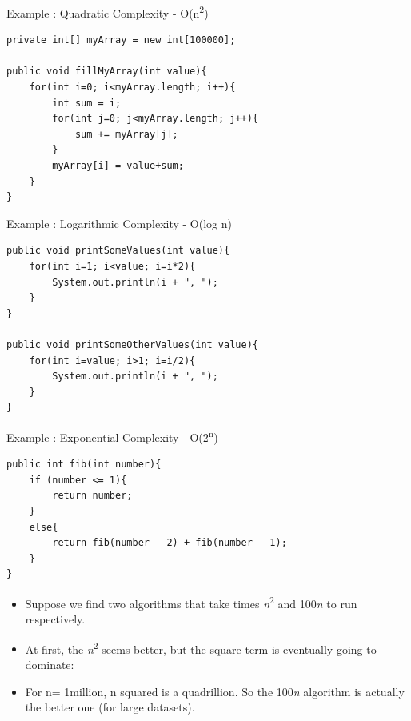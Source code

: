\documentclass{beamer}
\begin{document}
\begin{frame}[fragile]
Example : Quadratic Complexity - O(n\textsuperscript{2})
\begin{block}{}
\begin{lstlisting}
private int[] myArray = new int[100000];

public void fillMyArray(int value){
    for(int i=0; i<myArray.length; i++){
        int sum = i;
        for(int j=0; j<myArray.length; j++){
            sum += myArray[j];
        }
        myArray[i] = value+sum;
    }
}
\end{lstlisting}
\end{block}
\end{frame}

\begin{frame}[fragile]
Example : Logarithmic Complexity - O(log n)
\begin{block}{}
\begin{lstlisting}
public void printSomeValues(int value){
    for(int i=1; i<value; i=i*2){
        System.out.println(i + ", ");
    }
}

public void printSomeOtherValues(int value){
    for(int i=value; i>1; i=i/2){
        System.out.println(i + ", ");
    }
}
\end{lstlisting}
\end{block}
\end{frame}

\begin{frame}[fragile]
Example : Exponential Complexity - O(2\textsuperscript{n})
\begin{block}{}
\begin{lstlisting}
public int fib(int number){
    if (number <= 1){ 
        return number;
    }
    else{
        return fib(number - 2) + fib(number - 1);
    }
}
\end{lstlisting}
\end{block}
\end{frame}

\begin{frame}
\begin{itemize}
\item Suppose we find two algorithms that take times \textit{n}\textsuperscript{2 }and 100\textit{n }to run respectively.
\item At first, the \textit{n}\textsuperscript{2 }seems better, but the square term is eventually going to dominate:
\item For n= 1million, n squared is a quadrillion. So the 100\textit{n }algorithm is actually the better one (for large
datasets).
\end{itemize}
\end{frame} 
\end{document}
